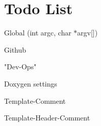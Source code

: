 \chapter{Todo List}
\hypertarget{todo}{}\label{todo}

\begin{DoxyRefList}
\item[Global \doxylink{main_8cpp_a0ddf1224851353fc92bfbff6f499fa97}{main} (int argc, char \texorpdfstring{$\ast$}{*}argv\mbox{[}\mbox{]})]\label{todo__todo000001}%
%

\begin{DoxyItemize}
\item Github
\item "{}\+Dev-\/\+Ops"{}
\item Doxygen settings
\item Template-\/\+Comment
\item Template-\/\+Header-\/\+Comment
\end{DoxyItemize}
\end{DoxyRefList}